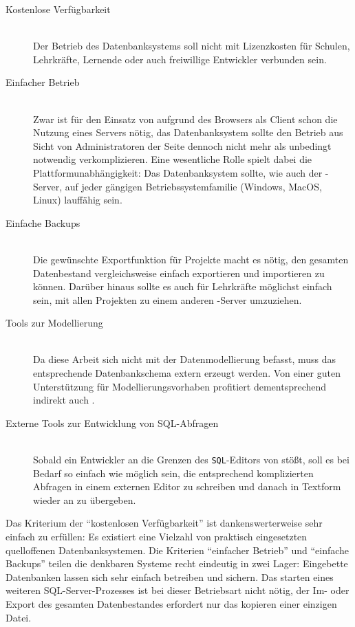 \begin{description}  
\item[Kostenlose Verfügbarkeit] \hfill \\
  Der Betrieb des Datenbanksystems soll nicht mit Lizenzkosten für Schulen, Lehrkräfte, Lernende oder auch freiwillige Entwickler verbunden sein.
\item[Einfacher Betrieb] \hfill \\
  Zwar ist für den Einsatz von \idename{} aufgrund des Browsers als Client schon die Nutzung eines Servers nötig, das Datenbanksystem sollte den Betrieb aus Sicht von Administratoren der Seite dennoch nicht mehr als unbedingt notwendig verkomplizieren. Eine wesentliche Rolle spielt dabei die Plattformunabhängigkeit: Das Datenbanksystem sollte, wie auch der \idename{}-Server, auf jeder gängigen Betriebssystemfamilie (Windows, MacOS, Linux) lauffähig sein.
\item[Einfache Backups] \hfill \\
  Die gewünschte Exportfunktion für Projekte macht es nötig, den gesamten Datenbestand vergleichsweise einfach exportieren und importieren zu können. Darüber hinaus sollte es auch für Lehrkräfte möglichst einfach sein, mit allen Projekten zu einem anderen \idename{}-Server umzuziehen.
\item[Tools zur Modellierung] \hfill \\
  Da diese Arbeit sich nicht mit der Datenmodellierung befasst, muss das entsprechende Datenbankschema extern erzeugt werden. Von einer guten Unterstützung für Modellierungsvorhaben profitiert dementsprechend indirekt auch \idename.
\item[Externe Tools zur Entwicklung von SQL-Abfragen] \hfill \\
  Sobald ein Entwickler an die Grenzen des \texttt{SQL}-Editors von \idename{} stößt, soll es bei Bedarf so einfach wie möglich sein, die entsprechend komplizierten Abfragen in einem externen Editor zu schreiben und danach in Textform wieder an \idename{} zu übergeben.
\end{description}

Das Kriterium der "`kostenlosen Verfügbarkeit"' ist dankenswerterweise sehr einfach zu erfüllen: Es existiert eine Vielzahl von praktisch eingesetzten quelloffenen Datenbanksystemen. Die Kriterien "`einfacher Betrieb"' und "`einfache Backups"' teilen die denkbaren Systeme recht eindeutig in zwei Lager: Eingebette Datenbanken lassen sich sehr einfach betreiben und sichern. Das starten eines weiteren SQL-Server-Prozesses ist bei dieser Betriebsart nicht nötig, der Im- oder Export des gesamten Datenbestandes erfordert nur das kopieren einer einzigen Datei.

